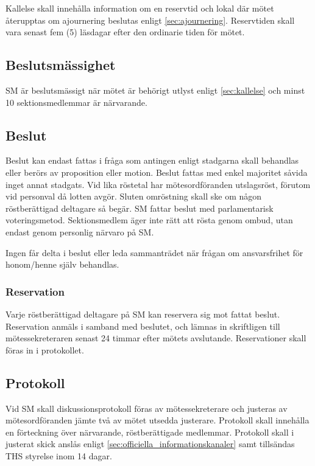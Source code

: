 \documentclass{dgovdoc}
\begin{document}
Kallelse skall innehålla information om en reservtid och lokal där mötet
återupptas om ajournering beslutas enligt \ref{sec:ajournering}. Reservtiden
skall vara senast fem (5) läsdagar efter den ordinarie tiden för mötet.

\subsection{Beslutsmässighet}

SM är beslutsmässigt när mötet är behörigt utlyst enligt 
\ref{sec:kallelse} och minst 10 sektionsmedlemmar är närvarande.

\subsection{Beslut}

Beslut kan endast fattas i fråga som antingen enligt stadgarna skall behandlas
eller berörs av proposition eller motion. Beslut fattas med enkel majoritet
såvida inget annat stadgats. Vid lika röstetal har mötesordföranden
utslagsröst, förutom vid personval då lotten avgör. Sluten omröstning skall ske
om någon röstberättigad deltagare så begär. SM fattar beslut med parlamentarisk
voteringsmetod. Sektionsmedlem äger inte rätt att rösta genom ombud, utan
endast genom personlig närvaro på SM.

Ingen får delta i beslut eller leda sammanträdet när frågan om ansvarsfrihet
för honom/henne själv behandlas.

\subsubsection{Reservation}

Varje röstberättigad deltagare på SM kan reservera sig mot fattat beslut.
Reservation anmäls i samband med beslutet, och lämnas in skriftligen till
mötessekreteraren senast 24 timmar efter mötets avslutande. Reservationer skall
föras in i protokollet.

\subsection{Protokoll}

Vid SM skall diskussionsprotokoll föras av mötessekreterare och justeras av
mötesordföranden jämte två av mötet utsedda justerare. Protokoll skall
innehålla en förteckning över närvarande, röstberättigade medlemmar. Protokoll
skall i justerat skick anslås enligt \ref{sec:officiella_informationskanaler}
samt tillsändas THS styrelse inom 14 dagar.
\end{document}
